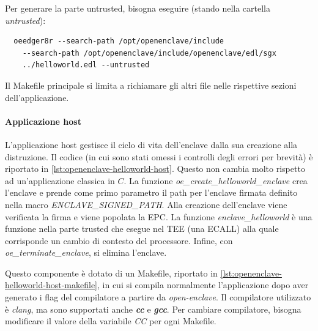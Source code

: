 \documentclass{article}
\begin{document}
Per generare la parte untrusted, bisogna eseguire (stando nella cartella \textit{untrusted}):
\begin{verbatim}
  oeedger8r --search-path /opt/openenclave/include 
    --search-path /opt/openenclave/include/openenclave/edl/sgx
    ../helloworld.edl --untrusted
\end{verbatim}

Il Makefile principale si limita a richiamare gli altri file nelle rispettive sezioni dell'applicazione. 



\paragraph{Applicazione host} L'applicazione host gestisce il ciclo di vita dell'enclave dalla sua creazione alla distruzione. Il codice (in cui sono stati omessi i controlli degli errori per brevità) è riportato in \cref{lst:openenclave-helloworld-host}. Questo non cambia molto rispetto ad un'applicazione classica in $C$. La funzione \textit{oe\_create\_helloworld\_enclave} crea l'enclave e prende come primo parametro il path per l'enclave firmata definito nella macro \textit{ENCLAVE\_SIGNED\_PATH}. Alla creazione dell'enclave viene verificata la firma e viene popolata la EPC. La funzione \textit{enclave\_helloworld} è una funzione nella parte trusted che esegue nel TEE (una ECALL) alla quale corrisponde un cambio di contesto del processore. Infine, con \textit{oe\_terminate\_enclave}, si elimina l'enclave.



Questo componente è dotato di un Makefile, riportato in \cref{lst:openenclave-helloworld-host-makefile}, in cui si compila normalmente l'applicazione dopo aver generato i flag del compilatore a partire da \textit{open-enclave}. Il compilatore utilizzato è \textit{clang}, ma sono supportati anche \textbf{\textit{cc}} e \textbf{\textit{gcc}}. Per cambiare compilatore, bisogna modificare il valore della variabile \textit{CC} per ogni Makefile.


\end{document}
